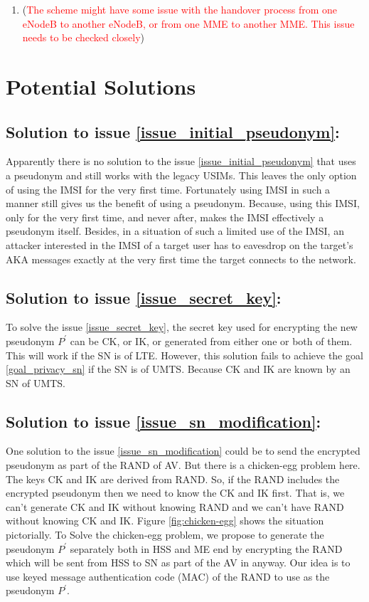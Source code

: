 \documentclass[12pt]{article}
\begin{document}
\begin{enumerate}
\item (\textcolor{red}{The scheme might have some issue with the handover process from one eNodeB to another eNodeB, or from one MME to another MME. This issue needs to be checked closely})



\end{enumerate}



\section*{Potential Solutions}
\subsection*{Solution to issue \ref{issue_initial_pseudonym}:} Apparently there is no solution to the issue \ref{issue_initial_pseudonym} that uses a pseudonym and still works with the legacy USIMs. This leaves the only option of using the IMSI for the very first time. Fortunately using IMSI in such a manner still gives us the benefit of using a pseudonym. Because, using this IMSI, only for the very first time, and never after, makes the IMSI effectively a pseudonym itself. Besides, in a situation of such a limited use of the IMSI, an attacker interested in the IMSI of a target user has to eavesdrop on the target's AKA messages exactly at the very first time the target connects to the network. 
\subsection*{Solution to issue \ref{issue_secret_key}:}  To solve the issue \ref{issue_secret_key}, the secret key used for encrypting the new pseudonym $P^{'}$ can be CK, or IK, or generated from either one or both of them. This will work if the SN is of LTE. However, this solution fails to achieve the goal \ref{goal_privacy_sn} if the SN is of UMTS. Because CK and IK are known by an SN of UMTS.

\subsection*{Solution to issue \ref{issue_sn_modification}:}  One solution to the issue \ref{issue_sn_modification} could be to send the encrypted pseudonym as part of the RAND of AV. But there is a chicken-egg problem here. The keys CK and IK are derived from RAND. So, if the RAND includes the encrypted pseudonym then we need to know the CK and IK first. That is, we can't generate CK and IK without knowing RAND and we can't have RAND without knowing CK and IK. Figure \ref{fig:chicken-egg} shows the situation pictorially. To Solve the chicken-egg problem, we propose to generate the pseudonym $P^{'}$ separately both in HSS and ME end by encrypting the RAND which will be sent from HSS to SN as part of the AV in anyway. Our idea is to use keyed message authentication code (MAC) of the RAND to use as the pseudonym  $P^{'}$. 
\end{document}
